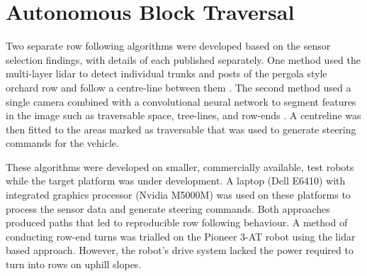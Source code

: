 \documentclass[preprint,authoryear,12pt]{elsarticle}
\begin{document}


\section{Autonomous Block Traversal}
\label{sect:autonomous}
    Two separate row following algorithms were developed based on the sensor selection findings, with details of each published separately.
    One method used the multi-layer lidar to detect individual trunks and posts of the pergola style orchard row and follow a centre-line between them \citep{Bell2016}.
    The second method used a single camera combined with a convolutional neural network to segment features in the image such as traversable space, tree-lines, and row-ends \citep{Bell2017}.
    A centreline was then fitted to the areas marked as traversable that was used to generate steering commands for the vehicle.

    These algorithms were developed on smaller, commercially available, test robots while the target platform was under development.
    A laptop (Dell E6410) with integrated graphics processor (Nvidia M5000M) was used on these platforms to process the sensor data and generate steering commands.
    Both approaches produced paths that led to reproducible row following behaviour.
    A method of conducting row-end turns was trialled on the Pioneer 3-AT robot using the lidar based approach.
    However, the robot's drive system lacked the power required to turn into rows on uphill slopes.
\end{document}
